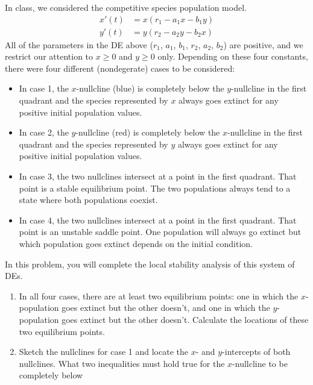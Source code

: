 \documentclass[12pt,letterpaper]{hmcpset}
\begin{document}
\begin{problem}[5]
    In class, we considered the competitive species population model.
    \begin{align*}
        x'(t)&=x(r_1-a_1x-b_1y)\\
        y'(t)&=y(r_2-a_2y-b_2x)
    \end{align*}
    All of the parameters in the DE above ($r_1$, $a_1$, $b_1$, $r_2$,
    $a_2$, $b_2$) are positive, and we restrict our attention to
    $x\geq0$ and $y\geq0$ only.  Depending on these four constants,
    there were four different (nondegerate) cases to be considered:
    \begin{itemize}
        \item In case 1, the $x$-nullcline (blue) is completely below the
            $y$-nullcline in the first quadrant and the species represented by
            $x$ always goes extinct for any positive initial population values.
        \item In case 2, the $y$-nullcline (red) is completely below
            the $x$-nullcline in the first quadrant and the species
            represented by $y$ always goes extinct for any positive
            initial population values.
        \item In case 3, the two nullclines intersect at a point in
            the first quadrant. That point is a stable equilibrium
            point. The two populations always tend to a state where both
            populations coexist.
        \item In case 4, the two nullclines intersect at a point in
            the first quadrant. That point is an unstable saddle
            point. One population will always go extinct but which
            population goes extinct depends on the initial condition.
    \end{itemize}
    In this problem, you will complete the local stability analysis of
    this system of DEs.
    \begin{enumerate}
        \item In all four cases, there are at least two equilibrium
            points: one in which the $x$-population goes extinct but the
            other doesn't, and one in which the $y$-population goes
            extinct but the other doesn't.  Calculate the locations of
            these two equilibrium points.
        \item Sketch the nullclines for case 1 and locate the $x$- and
            $y$-intercepts of both nullclines.  What two inequalities
            must hold true for the $x$-nullcline to be completely below

\end{enumerate}
\end{problem}
\end{document}
